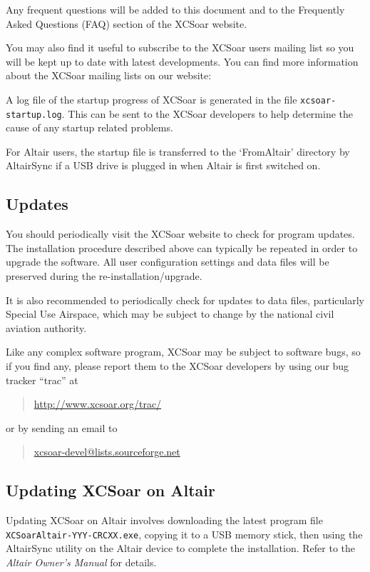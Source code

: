 \documentclass[a4paper,12pt]{refrep}
\begin{document}
Any frequent questions will be added to this document and to the Frequently
Asked Questions (FAQ) section of the XCSoar website.

You may also find it useful to subscribe to the XCSoar users mailing
list so you will be kept up to date with latest developments. You can find more
information about the XCSoar mailing lists on our website:
\begin{quote}
\xcsoarwebsite
\end{quote}

A log file of the startup progress of XCSoar is generated in the file
\verb|xcsoar-startup.log|. This can be sent to the XCSoar developers
to help determine the cause of any startup related problems.

For Altair users, the startup file is transferred to the `FromAltair'
directory by AltairSync if a USB drive is plugged in when Altair is
first switched on.

\subsection*{Updates}
You should periodically visit the XCSoar website to check for program
updates. The installation procedure described above can typically be
repeated in order to upgrade the software.  All user configuration
settings and data files will be preserved during the
re-installation/upgrade.

It is also recommended to periodically check for updates to data
files, particularly Special Use Airspace, which may be subject to
change by the national civil aviation authority.

Like any complex software program, XCSoar may be subject to software
bugs, so if you find any, please report them to the XCSoar developers
by using our bug tracker ``trac'' at 
\begin{quote}
\url{http://www.xcsoar.org/trac/}
\end{quote}
or by sending an email to
\begin{quote}
\url{xcsoar-devel@lists.sourceforge.net}
\end{quote} 

\subsection*{Updating XCSoar on Altair}
Updating XCSoar on Altair involves downloading the latest program file
{\tt XCSoarAltair-YYY-CRCXX.exe}, copying it to a USB memory stick,
then using the AltairSync utility on the Altair device to complete the
installation.  Refer to the {\em Altair Owner's Manual} for details.
\end{document}
